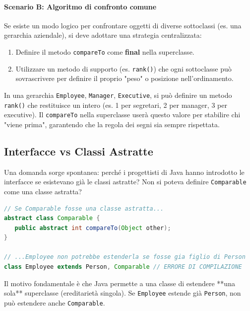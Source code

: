 \paragraph{Scenario B: Algoritmo di confronto comune}
Se esiste un modo logico per confrontare oggetti di diverse sottoclassi (es. una gerarchia aziendale), si deve adottare una strategia centralizzata:
\begin{enumerate}
    \item Definire il metodo \texttt{compareTo} come \textbf{final} nella superclasse.
    \item Utilizzare un metodo di supporto (es. \texttt{rank()}) che ogni sottoclasse può sovrascrivere per definire il proprio "peso" o posizione nell'ordinamento.
\end{enumerate}

\begin{example}
In una gerarchia \texttt{Employee}, \texttt{Manager}, \texttt{Executive}, si può definire un metodo \texttt{rank()} che restituisce un intero (es. 1 per segretari, 2 per manager, 3 per executive). Il \texttt{compareTo} nella superclasse userà questo valore per stabilire chi "viene prima", garantendo che la regola dei segni sia sempre rispettata.
\end{example}

\subsection{Interfacce vs Classi Astratte}

Una domanda sorge spontanea: perché i progettisti di Java hanno introdotto le interfacce se esistevano già le classi astratte? Non si poteva definire \texttt{Comparable} come una classe astratta?

\begin{lstlisting}[language=Java, caption={Perché questo approccio fallisce}]
// Se Comparable fosse una classe astratta...
abstract class Comparable {
   public abstract int compareTo(Object other);
}

// ...Employee non potrebbe estenderla se fosse gia figlio di Person
class Employee extends Person, Comparable // ERRORE DI COMPILAZIONE
\end{lstlisting}

Il motivo fondamentale è che Java permette a una classe di estendere **una sola** superclasse (ereditarietà singola). Se \texttt{Employee} estende già \texttt{Person}, non può estendere anche \texttt{Comparable}.



